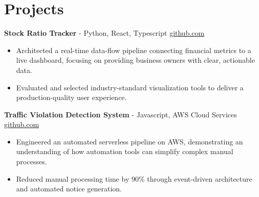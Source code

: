 \documentclass[11pt]{article}       %
\begin{document}

\vspace{-18.5pt}

\section*{Projects}

\textbf{Stock Ratio Tracker}{ - Python, React, Typescript} \hfill \href{https://github.com/Monica20030707/tradingDashboard-UI}{github.com} \\
\vspace{-9pt}
\begin{itemize}
  \item Architected a real-time data-flow pipeline connecting financial metrics to a live dashboard, focusing on providing business owners with clear, actionable data. 
  \item Evaluated and selected industry-standard visualization tools to deliver a production-quality user experience.
\end{itemize}

\textbf{Traffic Violation Detection System}{ - Javascript, AWS Cloud Services} \hfill \href{https://github.com/Monica20030707/AWS_rekonigition-N-read-database}{github.com} \\
\vspace{-9pt}
\begin{itemize}
  \item Engineered an automated serverless pipeline on AWS, demonstrating an understanding of how automation tools can simplify complex manual processes.
  \item Reduced manual processing time by 90\% through event-driven architecture and automated notice generation.
\end{itemize}
\end{document}
